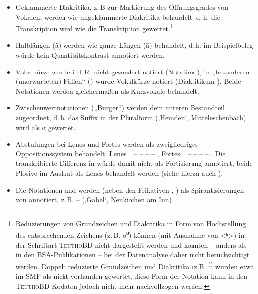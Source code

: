 \begin{itemize}
\item Geklammerte Diakritika, z.\,B zur Markierung des Öffnungsgrades von Vokalen, werden wie ungeklammerte Diakritika behandelt, d.\,h. die Transkription  wird wie die Transkription  gewertet.\footnote{Reduzierungen von Grundzeichen und Diakritika in Form von Hochstellung des entsprechenden Zeichens (z.\,B. o\textsuperscript{α}) können (mit Ausnahme von <ʰ>) in der Schriftart \textsc{TeuthoBD} nicht dargestellt werden und konnten -- anders als in den BSA-Publikationen -- bei der Datenanalyse daher nicht berücksichtigt werden. Doppelt reduzierte Grundzeichen und Diakritika (z.B. \textsuperscript{()} wurden etwa im SMF als nicht vorhanden gewertet, diese Form der Notation kann in den \textsc{TeuthoBD}{}-Kodaten jedoch nicht mehr nachvollzogen werden.}
\item Halblängen (â) werden wie ganze Längen (ā) behandelt, d.\,h. im Beispielbeleg  würde kein Quantitätskontrast annotiert werden.
\item Vokalkürze wurde i.\,d.\,R. nicht gesondert notiert (Notation ), in „besonderen (unerwarteten) Fällen“ (\citealt[163]{SBS1}) wurde Vokalkürze notiert (Diakritikum ). Beide Notationen werden gleichermaßen als Kurzvokale behandelt.
\item Zwischenwertnotationen („Burger“) werden dem unteren Bestandteil zugeordnet, d.\,h. das Suffix  in der Pluralform  (‚Hemden‘, Mitteleschenbach) wird als α gewertet.
\item Abstufungen bei Lenes und Fortes werden als zweigliedriges Oppositionssystem behandelt: Lenes=  –  –  –  – , Fortes=  –  –  –  – . Die transkribierte Differenz in  würde damit nicht als Fortisierung annotiert, beide Plosive im Auslaut als Lenes behandelt werden (siehe hierzu auch ).
\item Die Notationen  und  werden (neben den Frikativen , ) als Spirantisierungen von  annotiert, z.\,B.  --  (‚Gabel‘, Neukirchen am Inn)
\end{itemize}

